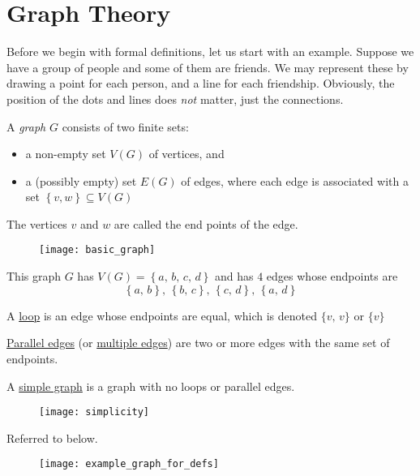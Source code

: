 \section{Graph Theory}
Before we begin with formal definitions, let us start with an example. Suppose we have a group of people and some of them are friends. We may represent these by drawing a point for each person, and a line for each friendship. Obviously, the position of the dots and lines does \emph{not} matter, just the connections.

\begin{definition}
    A \emph{graph} $G$ consists of two finite sets:
    \begin{itemize}
        \item a non-empty set $V(G)$ of vertices, and
        \item a (possibly empty) set $E(G)$ of edges, where each edge is associated with a set $\left\{v,w\right\}\subseteq V(G)$
    \end{itemize}

    The vertices $v$ and $w$ are called the end points of the edge.
\end{definition}

\begin{example}
    \begin{figure}[H]
        \centering
        \texttt{[image: basic\_graph]}
    \end{figure}

    This graph $G$ has $V(G) = \left\{a,\,b,\,c,\,d\right\}$ and has $4$ edges whose endpoints are $$\left\{a,\,b\right\},\,\left\{b,\,c\right\},\,\left\{c,\,d\right\},\,\left\{a,\,d\right\}$$
\end{example}

\begin{definition}
    A \underline{loop} is an edge whose endpoints are equal, which is denoted $\{v,\,v\}$ or $\{v\}$
\end{definition}

\begin{definition}
    \underline{Parallel edges} (or \underline{multiple edges}) are two or more edges with the same set of endpoints.
\end{definition}

\begin{definition}
    A \underline{simple graph} is a graph with no loops or parallel edges.

    \begin{figure}[H]
        \centering
        \texttt{[image: simplicity]}
    \end{figure}
\end{definition}
\newpage
\begin{example}
    Referred to below.
    \begin{figure}[H]
        \centering
        \texttt{[image: example\_graph\_for\_defs]}
    \end{figure}
\end{example}

